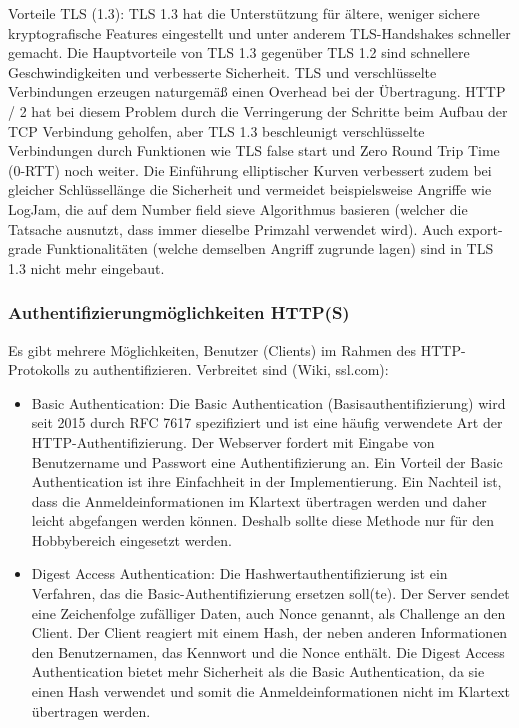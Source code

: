 \documentclass[notitlepage, hidelinks]{article}
\begin{document}
Vorteile TLS (1.3):
TLS 1.3 hat die Unterstützung für ältere, weniger sichere kryptografische Features eingestellt und unter anderem TLS-Handshakes schneller gemacht. Die Hauptvorteile von TLS 1.3 gegenüber TLS 1.2 sind schnellere Geschwindigkeiten und verbesserte Sicherheit. TLS und verschlüsselte Verbindungen erzeugen naturgemäß einen Overhead bei der Übertragung. HTTP / 2 hat bei diesem Problem durch die Verringerung der Schritte beim Aufbau der TCP Verbindung geholfen, aber TLS 1.3 beschleunigt verschlüsselte Verbindungen durch Funktionen wie TLS false start und Zero Round Trip Time (0-RTT) noch weiter. Die Einführung elliptischer Kurven verbessert zudem bei gleicher Schlüssellänge die Sicherheit und vermeidet beispielsweise Angriffe wie LogJam, die auf dem Number field sieve Algorithmus basieren (welcher die Tatsache ausnutzt, dass immer dieselbe Primzahl verwendet wird). Auch export-grade Funktionalitäten (welche demselben Angriff zugrunde lagen) sind in TLS 1.3 nicht mehr eingebaut.

\subsubsection{Authentifizierungmöglichkeiten HTTP(S)}
Es gibt mehrere Möglichkeiten, Benutzer (Clients) im Rahmen des HTTP-Protokolls zu authentifizieren. Verbreitet sind (Wiki, ssl.com):
\begin{itemize}
\item Basic Authentication: Die Basic Authentication (Basisauthentifizierung) wird seit 2015 durch RFC 7617 spezifiziert und ist eine häufig verwendete Art der HTTP-Authentifizierung. Der Webserver fordert mit Eingabe von Benutzername und Passwort eine Authentifizierung an. Ein Vorteil der Basic Authentication ist ihre Einfachheit in der Implementierung. Ein Nachteil ist, dass die Anmeldeinformationen im Klartext übertragen werden und daher leicht abgefangen werden können. Deshalb sollte diese Methode nur für den Hobbybereich eingesetzt werden.
\item Digest Access Authentication: Die Hashwertauthentifizierung ist ein Verfahren, das die Basic-Authentifizierung ersetzen soll(te). Der Server sendet eine Zeichenfolge zufälliger Daten, auch Nonce genannt, als Challenge an den Client. Der Client reagiert mit einem Hash, der neben anderen Informationen den Benutzernamen, das Kennwort und die Nonce enthält. Die Digest Access Authentication bietet mehr Sicherheit als die Basic Authentication, da sie einen Hash verwendet und somit die Anmeldeinformationen nicht im Klartext übertragen werden.
\end{itemize}
\end{document}

